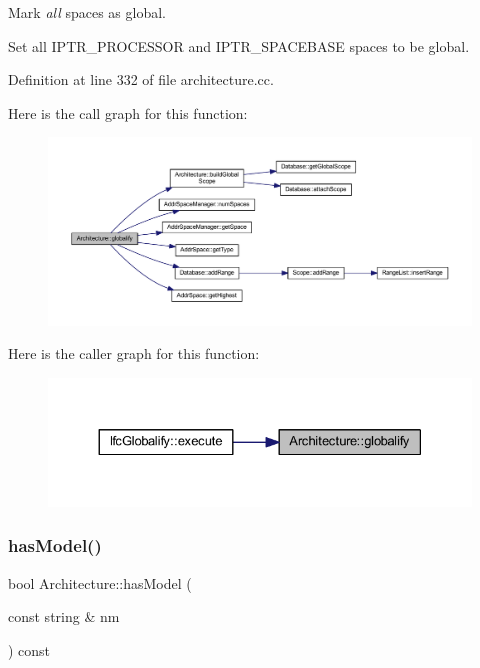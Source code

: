 Mark {\itshape all} spaces as global. 

Set all I\+P\+T\+R\+\_\+\+P\+R\+O\+C\+E\+S\+S\+OR and I\+P\+T\+R\+\_\+\+S\+P\+A\+C\+E\+B\+A\+SE spaces to be global. 

Definition at line 332 of file architecture.\+cc.

Here is the call graph for this function\+:
\nopagebreak
\begin{figure}[H]
\begin{center}
\leavevmode
\includegraphics[width=350pt]{class_architecture_a726878f225eebebb51d4e618f4d53631_cgraph}
\end{center}
\end{figure}
Here is the caller graph for this function\+:
\nopagebreak
\begin{figure}[H]
\begin{center}
\leavevmode
\includegraphics[width=330pt]{class_architecture_a726878f225eebebb51d4e618f4d53631_icgraph}
\end{center}
\end{figure}
\mbox{\label{class_architecture_a0075f8ca742086c8be493703b3f2f3cd}} 
\subsubsection{\texorpdfstring{hasModel()}{hasModel()}}
{\footnotesize\ttfamily bool Architecture\+::has\+Model (\begin{DoxyParamCaption}\item[{const string \&}]{nm }\end{DoxyParamCaption}) const}



